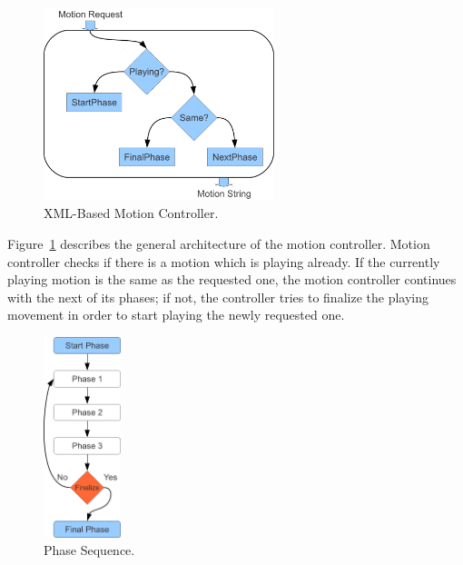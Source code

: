 \begin{figure}[t!]
\centering
  \includegraphics[width=0.6\textwidth]{Chapter3/figures/MotionController.pdf}
  \caption{XML-Based Motion Controller.}
  \label{fig:MotionController}
\end{figure}


Figure~\ref{fig:MotionController} describes the general architecture of the motion controller. Motion controller checks if there is a motion which is playing already. If  the currently playing motion is the same as the requested one, the motion controller continues with the next of its phases; if not, the controller tries to finalize the playing movement in order to start playing the newly requested one.


\begin{figure}[t!]
\centering
  \includegraphics[width=0.2\textwidth]{Chapter3/figures/MotionSequence.pdf}
  \caption{Phase Sequence.}
  \label{fig:PhaseSequence}
\end{figure}


